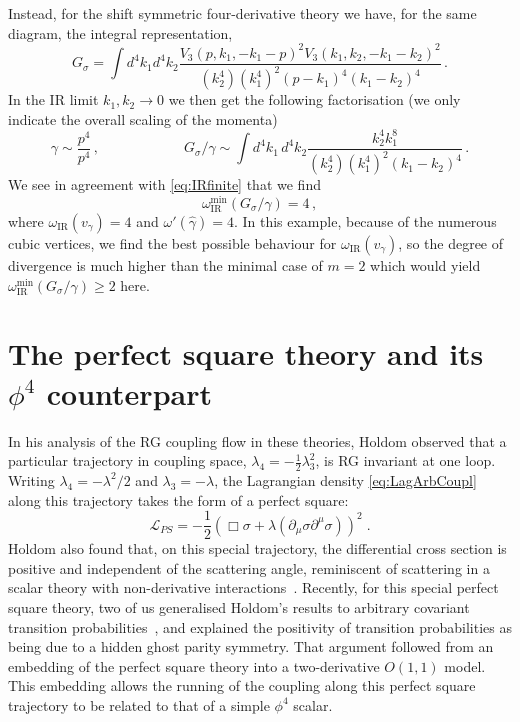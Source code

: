 \documentclass[a4paper,11pt]{article}
\begin{document}
Instead, for the shift symmetric four-derivative theory we have, for the same diagram, the integral representation,
\begin{equation}
        G_{\sigma} = \int d^4k_1d^4k_2 \frac{V_3(p,k_1,-k_1-p)^2V_3(k_1,k_2,-k_1-k_2)^2}{(k_2^4)(k_1^4)^2(p-k_1)^4(k_1 - k_2)^4} \,.
    \end{equation}
In the IR limit $k_1,k_2\to 0$ we then get the following factorisation (we only indicate the overall scaling of the momenta)
\begin{equation}
   \gamma \sim \frac{p^4}{p^4} \,, \qquad  \qquad \qquad G_{\sigma}/\gamma \sim \int d^4k_1 \, d^4k_2  \frac{k_2^4k_1^8}{(k_2^4)(k_1^4)^2(k_1 - k_2)^4}  \,.
\end{equation}
We see in agreement with \cref{eq:IRfinite} that we find
\begin{equation}
  {\omega}_{\mathrm{IR}}^{\mathrm{min}}\left(  G_{\sigma}/\gamma  \right) = 4 \,,
\end{equation}
where $\omega_{\mathrm{IR}}(v_\gamma) = 4$ and ${\omega}'(\hat{\gamma}) = 4$. In this example, because of the numerous cubic vertices, we find the best possible behaviour for $\omega_{\mathrm{IR}}(v_\gamma)$, so the degree of divergence is much higher than the minimal case of $m=2$  which would yield ${\omega}_{\mathrm{IR}}^{\mathrm{min}}\left(  G_{\sigma}/\gamma  \right)\ge 2$ here. 

\section{The perfect square theory and its \texorpdfstring{$\phi^4$}{phi 4} counterpart}\label{sec:Oclassicaly}

In his analysis of the RG coupling flow in these theories, Holdom observed that a particular trajectory in coupling space, $\lambda_4 = -\frac12 \lambda_3^2$, is RG invariant at one loop. Writing $\lambda_4=-\lambda^2/2$ and $\lambda_3=-\lambda$, the Lagrangian density \cref{eq:LagArbCoupl} along this trajectory takes the form of a perfect square: 
\begin{equation}
\label{eq:perfectsquare}
    \mathcal{L}_{PS} = - \frac12( \Box \sigma + \lambda (\partial_\mu \sigma \partial^\mu \sigma))^2\;.
\end{equation}
Holdom also found that, on this special trajectory, the differential cross section is positive and independent of the scattering angle, reminiscent of scattering in a scalar theory with non-derivative  interactions~\cite{Holdom:2023usn,Holdom:2024cfq}.  Recently, for this special perfect square theory, two of us generalised Holdom's results to arbitrary covariant transition probabilities~\cite{Bateman:2026letter}, and explained the positivity of transition probabilities as being due to a hidden ghost parity symmetry. That argument followed from an embedding of the perfect square theory into a two-derivative $O(1,1)$ model. This embedding allows the running of the coupling along this perfect square trajectory to be related to that of a simple $\phi^4$ scalar.
\end{document}
